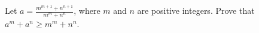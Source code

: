 Let $a = \frac{m^{m+1} + n^{n+1}}{m^m + n^n}$,  where $m$ and $n$ are positive integers.  Prove that $a^m + a^n \geq m^m + n^n$.